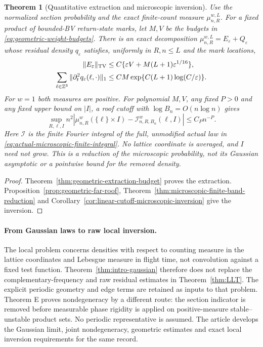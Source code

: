 \documentclass[11pt,reqno]{amsart}
\numberwithin{equation}{section}
\newtheorem{maintheorem}{Theorem}
\theoremstyle{definition}\newtheorem{definition}[theorem]{Definition}
\theoremstyle{remark}\newtheorem{remark}[theorem]{Remark}
\begin{document}
\begin{maintheorem}[Quantitative extraction and microscopic inversion]
\label{thm:intro-geometric-raw-reduction}
Use the normalized section probability and the exact finite-count
measure $\mu_{n,R}^{w,L}$. For a fixed product of bounded-BV return-state
marks, let $M,V$ be the budgets in \eqref{eq:geometric-weight-budgets}.
There is an exact decomposition $\mu_{n,R}^{w,L}=E_\varepsilon+Q_\varepsilon$
whose residual density $q_\varepsilon$ satisfies, uniformly in $R,n\le L$
and the mark locations,
\begin{align*}
 \|E_\varepsilon\|_{\operatorname{TV}}
    &\le C\{\varepsilon V+M(L+1)\varepsilon^{1/16}\},\\
 \sum_{\ell\in\mathbb Z^3}\|\partial_t^2q_\varepsilon(\ell,\cdot)\|_1
    &\le CM\exp\{C(L+1)\log(C/\varepsilon)\}.
\end{align*}
For $w=1$ both measures are positive. For polynomial $M,V$, any fixed
$P>0$ and any fixed upper bound on $|I|$, a roof cutoff with
$\log B_n=O(n\log n)$ gives
\[
 \sup_{R,\ell,I}n^2\left|
 \mu_{n,R}^w(\{\ell\}\times I)
       -\mathcal I_{n,R,B_n}^{w}(\ell,I)\right|\le C_Pn^{-P}.
\]
Here $\mathcal I$ is the finite Fourier integral of the full, unmodified
actual law in \eqref{eq:actual-microscopic-finite-integral}. No lattice
coordinate is averaged, and $I$ need not grow. This is a reduction of
the microscopic probability, not its Gaussian asymptotic or a pointwise
bound for the removed density.
\end{maintheorem}
\begin{proof}
Theorem~\ref{thm:geometric-extraction-budget} proves the extraction.
Proposition~\ref{prop:geometric-far-roof},
Theorem~\ref{thm:microscopic-finite-band-reduction} and
Corollary~\ref{cor:linear-cutoff-microscopic-inversion} give the inversion.
\end{proof}

\paragraph{From Gaussian laws to raw local inversion.}
The local problem concerns densities with respect to counting measure
in the lattice coordinates and Lebesgue measure in flight time, not
convolution against a fixed test function. Theorem~\ref{thm:intro-gaussian}
therefore does not replace the complementary-frequency and raw residual
estimates in Theorem~\ref{thm:LLT}. The explicit periodic geometry
and edge terms are retained as inputs to that problem. Theorem E proves
nondegeneracy by a different route: the section indicator is removed
before measurable phase rigidity is applied on positive-measure
stable--unstable product sets. No periodic representative is assumed.
The article develops the Gaussian limit, joint nondegeneracy, geometric
estimates and exact local inversion requirements for the same record.
\end{document}
